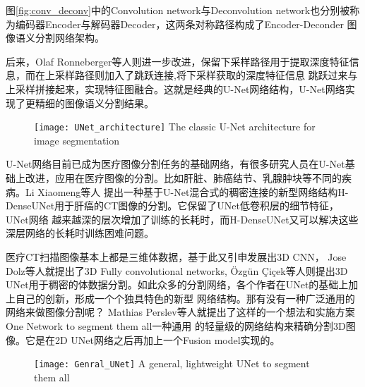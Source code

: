 	图\ref{fig:conv_deconv}中的Convolution network与Deconvolution network也分别被称为编码器Encoder与解码器Decoder，这两条对称路径构成了Encoder-Deconder
	图像语义分割网络架构。
	
	后来，Olaf Ronneberger等人\cite{ronneberger2015u}则进一步改进，保留下采样路径用于提取深度特征信息，而在上采样路径则加入了跳跃连接,将下采样获取的深度特征信息
	跳跃过来与上采样拼接起来，实现特征图融合。这就是经典的U-Net网络结构，U-Net网络实现了更精细的图像语义分割结果。
	
	\begin{figure}[!htp]
		\centering
		\texttt{[image: UNet\_architecture]}
			{The classic U-Net architecture for image segmentation}
		\label{fig:UNet}
	\end{figure}
	
	U-Net网络目前已成为医疗图像分割任务的基础网络，有很多研究人员在U-Net基础上改进，应用在医疗图像的分割。比如肝脏、肺癌结节、乳腺肿块等不同的疾病。Li Xiaomeng等人
	\cite{Li2017HDenseUNetHD}提出一种基于U-Net混合式的稠密连接的新型网络结构H-DenseUNet用于肝癌的CT图像的分割。它保留了UNet低卷积层的细节特征，UNet网络
	越来越深的层次增加了训练的长耗时，而H-DenseUNet又可以解决这些深层网络的长耗时训练困难问题。
	
	医疗CT扫描图像基本上都是三维体数据，基于此又引申发展出3D CNN， Jose Dolz等人\cite{Dolze3DFCN}就提出了3D Fully convolutional networks, {\"O}zg{\"u}n {\c{C}}i{\c{c}}ek等人\cite{cciccek20163d}则提出3D UNet用于稠密的体数据分割。如此众多的分割网络，各个作者在UNet的基础上加上自己的创新，形成一个个独具特色的新型
	网络结构。那有没有一种广泛通用的网络来做图像分割呢？ Mathias Perslev等人\cite{PerslevGeneralUNetFusion}就提出了这样的一个想法和实施方案
	One Network to segment them all一种通用	的轻量级的网络结构来精确分割3D图像。它是在2D UNet网络之后再加上一个Fusion model实现的。
	\begin{figure}[!htp]
		\centering
		\texttt{[image: Genral\_UNet]}
			{A general, lightweight UNet to segment them all}
		\label{fig:Genral_UNet}
	\end{figure}
	

